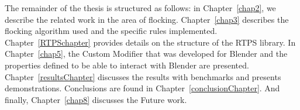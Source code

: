 
The remainder of the thesis is structured as follows:  in Chapter~\ref{chap2}, we describe the related work in the area of flocking. Chapter~\ref{chap3} describes the flocking algorithm used and the specific rules implemented. Chapter~\ref{RTPSchapter} provides details on the structure of the RTPS library. In Chapter~\ref{chap5}, the Custom Modifier that was developed for Blender and the properties defined to be able to interact with Blender are presented. Chapter~\ref{resultsChapter} discusses the results with benchmarks and presents demonstrations. Conclusions are found in Chapter~\ref{conclusionChapter}.  And finally, Chapter~\ref{chap8} discusses the Future work. 

